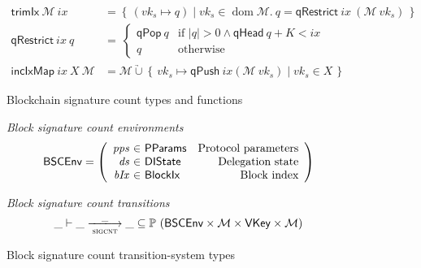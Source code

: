 \documentclass[11pt,a4paper]{article}
\DeclareMathOperator{\dom}{dom}
\newcommand{\powerset}[1]{\mathbb{P}~#1}
\newcommand\Set[2]{\left\{\,#1\mid#2\,\right\}}
\newcommand{\unionoverride}{\mathbin{\underrightarrow\cup}}
\newcommand{\var}[1]{\mathit{#1}}
\newcommand{\fun}[1]{\mathsf{#1}}
\newcommand{\type}[1]{\mathsf{#1}}
\newcommand{\size}[1]{\left| #1 \right|}
\newcommand{\trans}[2]{\xlongrightarrow[\textsc{#1}]{#2}}
\newcommand{\partialf}{\mapsto}
\newcommand{\BlockIx}{\type{BlockIx}}
\newcommand{\VKey}{\type{VKey}}
\newcommand{\DelegState}{\type{DIState}}
\newcommand{\ProtParams}{\type{PParams}} %
\newcommand{\signmapname}{\mathcal{M}}
\newcommand{\trimixname}{trimIx}
\newcommand{\incixmapname}{incIxMap}
\newcommand{\qrestrname}{qRestrict}
\newcommand{\qpopname}{qPop}
\newcommand{\qheadname}{qHead}
\newcommand{\qpushname}{qPush}
\newcommand{\signmap}[1]{\fun{\signmapname} ~ #1}
\newcommand{\qrestr}[2]{\fun{\qrestrname} ~ #1 ~ #2}
\newcommand{\trimix}[2]{\fun{\trimixname} ~ #1 ~ #2}
\newcommand{\incixmap}[3]{\fun{\incixmapname} ~ #1 ~ #2 ~ #3}
\newcommand{\qpop}[1]{\fun{\qpopname} ~ #1}
\newcommand{\qhead}[1]{\fun{\qheadname} ~ #1}
\newcommand{\qpush}[1]{\fun{\qpushname} ~ #1}
\begin{document}
\begin{figure}[ht]
  \begin{align}
  \label{eq:trimix}
  \trimix{\signmapname}{\var{ix}} & = \Set{(\var{vk_s} \partialf q)}{\var{vk_s} \in \dom \signmapname.~
  q = \qrestr{\var{ix}}{(\signmap{\var{vk_s}}})} \\
  \qrestr{\var{ix}}{q} & = \
  \begin{cases}
    \qpop{q} & \text{if } \size{q} > 0 \wedge \qhead{q} + K < \var{ix} \\
    q & \text{otherwise}
  \end{cases} \\
  \label{eq:incixmap}
    \incixmap{\var{ix}}{\var{X}}{\signmapname} & = \signmapname \unionoverride
                                                 \Set{\var{vk_s} \partialf \qpush{\var{ix}}(\signmap{\var{vk_s}})}{vk_s \in \var{X}}
  \end{align}
  \caption{Blockchain signature count types and functions}
  \label{fig:defs:sigcnt}
\end{figure}

\begin{figure}[ht]
  \emph{Block signature count environments}
  \begin{equation*}
    \BSCEnv =
    \left(
      \begin{array}{r@{~\in~}lr}
        \var{pps} & \ProtParams & \text{Protocol parameters} \\
        \var{ds} & \DelegState & \text{Delegation state} \\
        \var{bIx} & \BlockIx & \text{Block index}
      \end{array}
    \right)
  \end{equation*}

  \emph{Block signature count transitions}
  \begin{equation*}
    \_ \vdash \var{\_} \trans{sigcnt}{\_} \var{\_} \subseteq
    \powerset (\BSCEnv \times \signmapname \times \VKey \times \signmapname)
  \end{equation*}
  \caption{Block signature count transition-system types}
  \label{fig:ts-types:sigcnt}
\end{figure}
\end{document}
